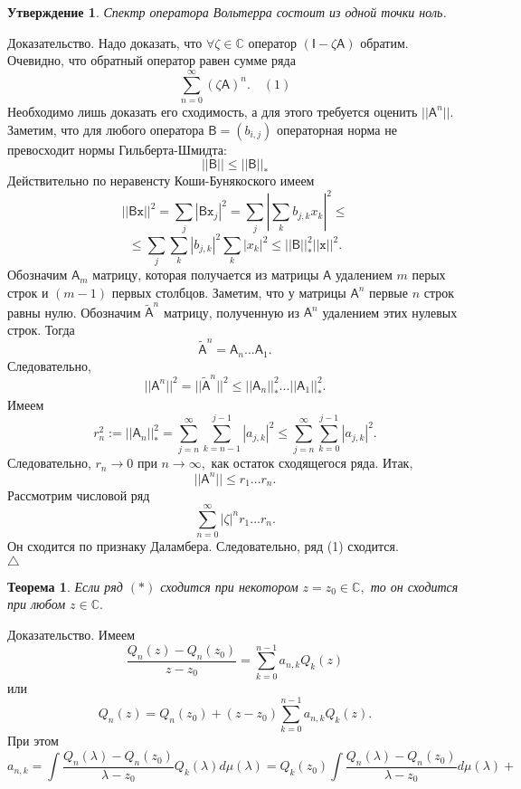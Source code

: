 \documentclass[12pt,a4paper]{article}
\theoremstyle{plain}   \newtheorem{Pro}{Задача}
\newtheorem{Sta}{Утверждение}
\newtheorem{The}{Теорема}
\begin{document}
\begin{Sta}
Спектр оператора Вольтерра состоит из одной точки ноль.
\end{Sta}
{\Large Доказательство.}
Надо доказать, что
$ \forall \zeta \in \mathbb{C} $
оператор
$ (\mathsf{I}-\zeta \mathsf{A}) $
обратим. Очевидно, что обратный оператор равен сумме ряда
$$
  \sum _{n=0}^{\infty} (\zeta \mathsf{A})^n .
  \quad ( 1)
$$
Необходимо лишь доказать его сходимость, а для этого требуется
оценить
$ ||\mathsf{A}^n ||. $
Заметим, что для любого оператора
$ \mathsf{B}=(b_{i,j}) $
операторная норма не превосходит нормы Гильберта-Шмидта:
$$
  ||\mathsf{B}|| \leq ||\mathsf{B}||_{\ast}
$$
Действительно по неравенсту Коши-Бунякоского имеем
$$
  ||\mathsf{B}\mathtt{x}||^2 =\sum _j |\mathsf{B}\mathtt{x}_j |^2 =
  \sum _j |\sum _k b_{j,k}x_k |^2 \leq
$$
$$
  \leq \sum _j \sum _k |b_{j,k}|^2 \sum _k |x_k |^2 \leq
  ||\mathsf{B}||_{\ast}^2 ||\mathtt{x}||^2 .
$$
Обозначим
$ \mathsf{A}_m $
матрицу, которая получается из матрицы
$ \mathsf{A} $
удалением
$ m $
перых строк и
$ (m-1) $
первых столбцов. Заметим, что у матрицы
$ \mathsf{A}^n $
первые
$ n $
строк равны нулю. Обозначим
$ \tilde{\mathsf{A}}^n $
матрицу, полученную из
$ \mathsf{A}^n $
удалением этих нулевых строк. Тогда
$$
  \tilde{\mathsf{A}}^n = \mathsf{A}_n ...\mathsf{A}_1 .
$$
Следовательно,
$$
  ||\mathsf{A}^n ||^2 =|| \tilde{\mathsf{A}}^n ||^2 \leq
  ||\mathsf{A}_n ||_{\ast}^2 ...||\mathsf{A}_1 ||_{\ast}^2 .
$$
Имеем
$$
  r_n ^2 := ||\mathsf{A}_n ||_{\ast}^2 =
  \sum _{j=n}^{\infty} \sum _{k=n-1}^{j-1}
  |a_{j,k}|^2 \leq
  \sum _{j=n}^{\infty} \sum _{k=0}^{j-1} |a_{j,k}|^2 .
$$
Следовательно,
$ r_n \rightarrow 0 $
при
$ n \rightarrow \infty , $
как остаток сходящегося ряда. Итак,
$$
  ||\mathsf{A}^n || \leq r_1 ...r_n .
$$
Рассмотрим числовой ряд
$$
  \sum _{n=0}^{\infty} |\zeta |^n r_1 ...r_n .
$$
Он сходится по признаку Даламбера. Следовательно, ряд (1)
сходится.
\\
$ \triangle $
\begin{The}
Если ряд
$ (\ast ) $
сходится при некотором
$ z=z_0 \in \mathbb{C} , $
то он сходится при любом
$ z \in \mathbb{C} . $
\end{The}
{\Large Доказательство.}
Имеем
$$
  \frac{Q_n (z)-Q_n (z_0 )}{z-z_0 }=
  \sum _{k=0}^{n-1}a_{n,k}Q_k (z)
$$
или
$$
  Q_n (z)=Q_n (z_0 ) +(z-z_0 ) \sum _{k=0}^{n-1}
  a_{n,k}Q_k (z).
$$
При этом
$$
  a_{n,k}= \int \frac{Q_n (\lambda )-Q_n (z_0 )}
  {\lambda -z_0 } Q_k (\lambda ) d \mu (\lambda ) =
  Q_k (z_0 ) \int \frac{Q_n (\lambda )-Q_n (z_0 )}
  {\lambda -z_0 } d\mu (\lambda) +
$$
\end{document}
